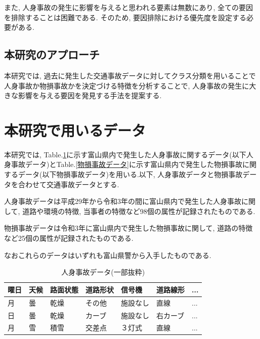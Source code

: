 \documentclass[a4j,8.5pt, twocolumn,fleqn]{jbook}
\begin{document}
また, 人身事故の発生に影響を与えると思われる要素は無数にあり, 全ての要因を排除することは困難である. 
そのため, 要因排除における優先度を設定する必要がある. 

\subsection{本研究のアプローチ}
本研究では, 過去に発生した交通事故データに対してクラス分類を用いることで人身事故か物損事故かを決定づける特徴を分析することで, 人身事故の発生に大きな影響を与える要因を発見する手法を提案する. 



\section{本研究で用いるデータ}
本研究では, Table.\ref{人身事故データ}に示す富山県内で発生した人身事故に関するデータ(以下人身事故データ)とTable.\ref{物損事故データ}に示す富山県内で発生した物損事故に関するデータ(以下物損事故データ)を用いる.以下, 人身事故データと物損事故データを合わせて交通事故データとする. 

人身事故データは平成29年から令和3年の間に富山県内で発生した人身事故に関して, 道路や環境の特徴, 当事者の特徴など98個の属性が記録されたものである. 

物損事故データは令和3年に富山県内で発生した物損事故に関して, 道路の特徴など25個の属性が記録されたものである. 

なおこれらのデータはいずれも富山県警から入手したものである. 

\begin{table}[htb]
    \caption{人身事故データ(一部抜粋)}
    \label{人身事故データ}
    \small
    \begin{tabular}{|l|l|l|l|l|l|l|}
        \hline
        \textbf{曜日} & \textbf{天候} & \textbf{路面状態} & \textbf{道路形状} & \textbf{信号機} & \textbf{道路線形} & \textbf{...} \\ \hline
        月           & 曇           & 乾燥            & その他           & 施設なし         & 直線         & ...          \\ \hline
        日           & 曇           & 乾燥            & カーブ        & 施設なし         & 右カーブ       & ...          \\ \hline
        月           & 雪           & 積雪            & 交差点           & ３灯式      & 直線         & ...          \\ \hline
    \end{tabular}
\end{table}
\end{document}
